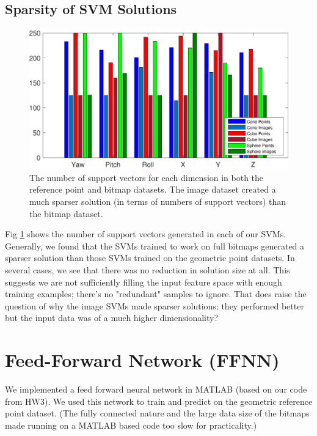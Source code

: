 \documentclass[journal]{IEEEtran}
\begin{document}
\subsection{Sparsity of SVM Solutions}
\begin{figure}[H]
	\hspace{-10 ex}

	\centering
	\includegraphics[width=0.9\linewidth]{supportVectors}

	\caption{The number of support vectors for each dimension in both the reference point and bitmap datasets. The image dataset created a much sparser solution (in terms of numbers of support vectors) than the bitmap dataset.}
	\label{supportVectors}
\end{figure}

Fig \ref{supportVectors} shows the number of support vectors generated in each of our SVMs. Generally, we found that the SVMs trained to work on full bitmaps generated a sparser solution than those SVMs trained on the geometric point datasets. In several cases, we see that there was no reduction in solution size at all. This suggests we are not sufficiently filling the input feature space with enough training examples; there's no "redundant" samples to ignore. That does raise the question of why the image SVMs made sparser solutions; they performed better but the input data was of a much higher dimensionality?


\section{Feed-Forward Network (FFNN)}
We implemented a feed forward neural network in MATLAB (based on our code from HW3). We used this network to train and predict on the geometric reference point dataset. (The fully connected nature and the large data size of the bitmaps made running on a MATLAB based code too slow for practicality.)
\end{document}

